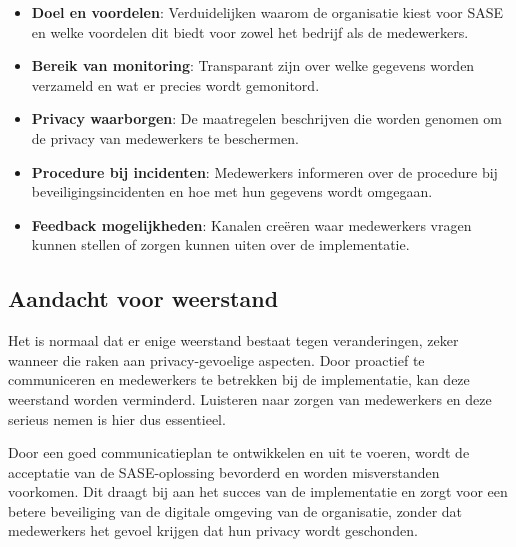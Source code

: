 \begin{itemize}
    \item \textbf{Doel en voordelen}: Verduidelijken waarom de organisatie kiest voor SASE en welke voordelen dit biedt voor zowel het bedrijf als de medewerkers.
    \item \textbf{Bereik van monitoring}: Transparant zijn over welke gegevens worden verzameld en wat er precies wordt gemonitord.
    \item \textbf{Privacy waarborgen}: De maatregelen beschrijven die worden genomen om de privacy van medewerkers te beschermen.
    \item \textbf{Procedure bij incidenten}: Medewerkers informeren over de procedure bij beveiligingsincidenten en hoe met hun gegevens wordt omgegaan.
    \item \textbf{Feedback mogelijkheden}: Kanalen creëren waar medewerkers vragen kunnen stellen of zorgen kunnen uiten over de implementatie.
\end{itemize}

\subsection{Aandacht voor weerstand}
Het is normaal dat er enige weerstand bestaat tegen veranderingen, zeker wanneer die raken aan privacy-gevoelige aspecten. Door proactief te communiceren en medewerkers te betrekken bij de implementatie, kan deze weerstand worden verminderd. Luisteren naar zorgen van medewerkers en deze serieus nemen is hier dus essentieel.

Door een goed communicatieplan te ontwikkelen en uit te voeren, wordt de acceptatie van de SASE-oplossing bevorderd en worden misverstanden voorkomen. Dit draagt bij aan het succes van de implementatie en zorgt voor een betere beveiliging van de digitale omgeving van de organisatie, zonder dat medewerkers het gevoel krijgen dat hun privacy wordt geschonden.
